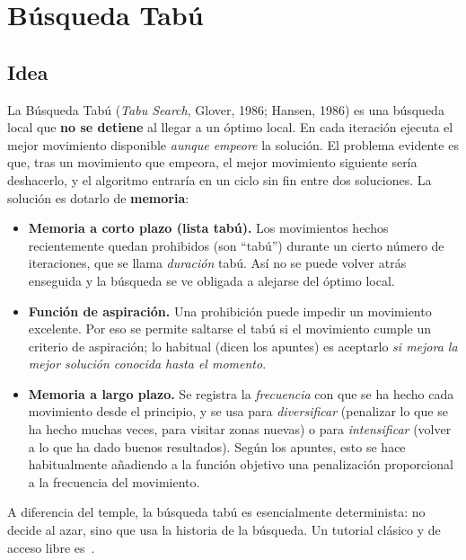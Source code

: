 \section{Búsqueda Tabú}\label{sec:tabu}

\subsection{Idea}

La Búsqueda Tabú (\emph{Tabu Search}, Glover, 1986; Hansen, 1986) es una búsqueda local que
\textbf{no se detiene} al llegar a un óptimo local. En cada iteración ejecuta el mejor
movimiento disponible \emph{aunque empeore} la solución. El problema evidente es que, tras un
movimiento que empeora, el mejor movimiento siguiente sería deshacerlo, y el algoritmo
entraría en un ciclo sin fin entre dos soluciones. La solución es dotarlo de
\textbf{memoria}:

\begin{itemize}
  \item \textbf{Memoria a corto plazo (lista tabú).} Los movimientos hechos recientemente
        quedan prohibidos (son ``tabú'') durante un cierto número de iteraciones, que se
        llama \emph{duración} tabú. Así no se puede volver atrás enseguida y la búsqueda se
        ve obligada a alejarse del óptimo local.
  \item \textbf{Función de aspiración.} Una prohibición puede impedir un movimiento
        excelente. Por eso se permite saltarse el tabú si el movimiento cumple un criterio
        de aspiración; lo habitual (dicen los apuntes) es aceptarlo \emph{si mejora la mejor
        solución conocida hasta el momento}.
  \item \textbf{Memoria a largo plazo.} Se registra la \emph{frecuencia} con que se ha hecho
        cada movimiento desde el principio, y se usa para \emph{diversificar} (penalizar lo
        que se ha hecho muchas veces, para visitar zonas nuevas) o para \emph{intensificar}
        (volver a lo que ha dado buenos resultados). Según los apuntes, esto se hace
        habitualmente añadiendo a la función objetivo una penalización proporcional a la
        frecuencia del movimiento.
\end{itemize}

A diferencia del temple, la búsqueda tabú es esencialmente determinista: no decide al azar,
sino que usa la historia de la búsqueda. Un tutorial clásico y de acceso libre
es~\cite{glover}.


